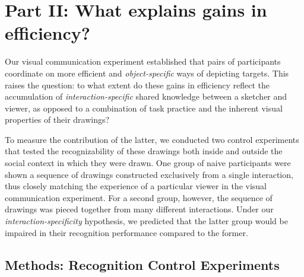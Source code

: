 \documentclass[10pt,letterpaper]{article}
\newcommand{\ndg}[1]{{\textcolor{Green}{[ndg: #1]}}}
\begin{document}
\section{Part II: What explains gains in efficiency?}

Our visual communication experiment established that pairs of participants coordinate on more efficient and \emph{object-specific} ways of depicting targets. %
This raises the question: to what extent do these gains in efficiency reflect the accumulation of \emph{interaction-specific} shared knowledge between a sketcher and viewer, as opposed to a combination of task practice and the inherent visual properties of their drawings?

To measure the contribution of the latter, we conducted two control experiments that tested the recognizability of these drawings both inside and outside the social context in which they were drawn.
One group of naive participants were shown a sequence of drawings constructed exclusively from a single interaction, thus closely matching the experience of a particular viewer in the visual communication experiment.
For a second group, however, the sequence of drawings was pieced together from many different interactions.
Under our \emph{interaction-specificity} hypothesis, we predicted that the latter group would be impaired in their recognition performance compared to the former.


\subsection{Methods: Recognition Control Experiments}
\end{document}
